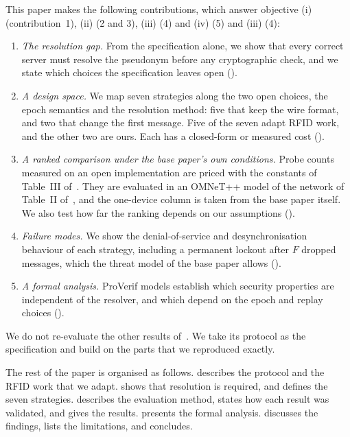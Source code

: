 This paper makes the following contributions, which answer objective (i) (contribution~1), (ii) (2 and 3)\iffv, (iii)
(4) and (iv) (5)\else{} and (iii) (4)\fi:
\begin{enumerate}
\item \emph{The resolution gap.} From the specification alone, we show that every correct server must resolve the
pseudonym before any cryptographic check, and we state which choices the specification leaves open
().
\item \emph{A design space.} We map seven strategies along the two open choices, the epoch semantics and the resolution
method: five that keep the wire format, and two that change the first message. Five of the seven adapt RFID work, and the
other two are ours. Each has a closed-form or measured cost ().
\item \emph{A ranked comparison under the base paper's own conditions.} Probe counts measured on an open implementation
are priced with the constants of Table~III of~\cite{base}. They are evaluated in an OMNeT++ model of the network of
Table~II of~\cite{base}, and the one-device column is taken from the base paper itself. We also test how far the ranking
depends on our assumptions ().
\item \emph{Failure modes.} We show the denial-of-service and desynchronisation behaviour of each strategy, including a
permanent lockout after $F$ dropped messages, which the threat model of the base paper allows
().
\iffv
\item \emph{A formal analysis.} ProVerif models establish which security properties are independent of the resolver,
and which depend on the epoch and replay choices ().
\fi
\end{enumerate}

We do not re-evaluate the other results of~\cite{base}. We take its protocol as the specification and build on the parts
that we reproduced exactly.

\ifshortpaper\else
The rest of the paper is organised as follows.  describes the protocol and the RFID work that we
adapt.  shows that resolution is required, and  defines the seven strategies.
 describes the evaluation method,  states how each result was validated, and
 gives the results.
\iffv
{} presents the formal analysis.
\fi
{} discusses the findings,  lists the limitations, and  concludes.
\fi

